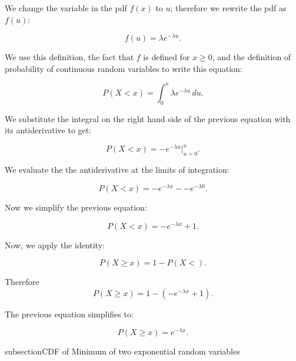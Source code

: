 \documentclass[a4paper,11pt]{article}
\begin{document}
We change the variable in the pdf $f\left(x \right)$ to $u$; therefore we
rewrite the pdf as $f\left( u \right)$:

\begin{equation}
f\left(u \right) = \lambda e^{-\lambda u}.
\end{equation}

We use this definition, the fact that $f$ is defined for $x \geq 0$, and the 
definition of probability of continuous random variables \cite{readingx5b} to 
write this equation:

\begin{equation}
P\left(X < x \right) = \int_0^x \lambda e^{-\lambda u} \,du.
\end{equation}

We substitute the integral on the right hand side of the previous equation 
with its antiderivative to get:

\begin{equation}
P\left(X < x \right) = -e^{-\lambda u} \bigg\rvert_{u=0}^x.
\end{equation}

We evaluate the the antiderivative at the limits of integration:

\begin{equation}
P\left(X < x \right) = -e^{-\lambda x} - -e^{-\lambda 0}.
\end{equation}

Now we simplify the previous equation:

\begin{equation}
P\left(X < x \right) = -e^{-\lambda x} + 1.
\end{equation}

Now, we apply the identity:

\begin{equation}
P\left(X \geq x \right) = 1 - P\left(X < \right).
\end{equation}

Therefore
\begin{equation}
P\left(X \geq x \right) = 1 - \left( -e^{-\lambda x} + 1 \right).
\end{equation}

The previous equation simplifies to:

\begin{equation}
P\left(X \geq x \right) = e^{-\lambda x}.
\end{equation}

subsection{CDF of Minimum of two exponential random variables}
\end{document}

